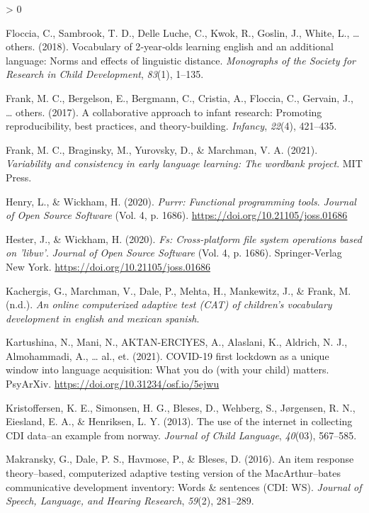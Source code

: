 \documentclass[
  english,
  ,man,floatsintext]{apa6}
\newlength{\cslhangindent}
\newenvironment{CSLReferences}[2] %
 {%
  \setlength{\parindent}{0pt}
  \ifodd #1 \everypar{\setlength{\hangindent}{\cslhangindent}}\ignorespaces\fi
  \ifnum #2 > 0
  \setlength{\parskip}{#2\baselineskip}
  \fi
 }%
 {}
\begin{document}
\begin{CSLReferences}{1}{0}
\leavevmode\hypertarget{ref-floccia2018}{}%
Floccia, C., Sambrook, T. D., Delle Luche, C., Kwok, R., Goslin, J., White, L., \ldots{} others. (2018). Vocabulary of 2‐year‐olds learning english and an additional language: Norms and effects of linguistic distance. \emph{Monographs of the Society for Research in Child Development}, \emph{83}(1), 1--135.

\leavevmode\hypertarget{ref-frank2017}{}%
Frank, M. C., Bergelson, E., Bergmann, C., Cristia, A., Floccia, C., Gervain, J., \ldots{} others. (2017). A collaborative approach to infant research: Promoting reproducibility, best practices, and theory-building. \emph{Infancy}, \emph{22}(4), 421--435.

\leavevmode\hypertarget{ref-Frank2021}{}%
Frank, M. C., Braginsky, M., Yurovsky, D., \& Marchman, V. A. (2021). \emph{Variability and consistency in early language learning: The wordbank project}. MIT Press.

\leavevmode\hypertarget{ref-R-purrr}{}%
Henry, L., \& Wickham, H. (2020). \emph{Purrr: Functional programming tools}. \emph{Journal of Open Source Software} (Vol. 4, p. 1686). \url{https://doi.org/10.21105/joss.01686}

\leavevmode\hypertarget{ref-R-fs}{}%
Hester, J., \& Wickham, H. (2020). \emph{Fs: Cross-platform file system operations based on 'libuv'}. \emph{Journal of Open Source Software} (Vol. 4, p. 1686). Springer-Verlag New York. \url{https://doi.org/10.21105/joss.01686}

\leavevmode\hypertarget{ref-Kachergis}{}%
Kachergis, G., Marchman, V., Dale, P., Mehta, H., Mankewitz, J., \& Frank, M. (n.d.). \emph{An online computerized adaptive test (CAT) of children's vocabulary development in english and mexican spanish}.

\leavevmode\hypertarget{ref-Kartushina2021}{}%
Kartushina, N., Mani, N., AKTAN-ERCIYES, A., Alaslani, K., Aldrich, N. J., Almohammadi, A., \ldots{} al., et. (2021). COVID-19 first lockdown as a unique window into language acquisition: What you do (with your child) matters. PsyArXiv. \url{https://doi.org/10.31234/osf.io/5ejwu}

\leavevmode\hypertarget{ref-kristoffersen2013}{}%
Kristoffersen, K. E., Simonsen, H. G., Bleses, D., Wehberg, S., Jørgensen, R. N., Eiesland, E. A., \& Henriksen, L. Y. (2013). The use of the internet in collecting CDI data--an example from norway. \emph{Journal of Child Language}, \emph{40}(03), 567--585.

\leavevmode\hypertarget{ref-makransky2016}{}%
Makransky, G., Dale, P. S., Havmose, P., \& Bleses, D. (2016). An item response theory--based, computerized adaptive testing version of the MacArthur--bates communicative development inventory: Words \& sentences (CDI: WS). \emph{Journal of Speech, Language, and Hearing Research}, \emph{59}(2), 281--289.


\end{CSLReferences}
\end{document}
